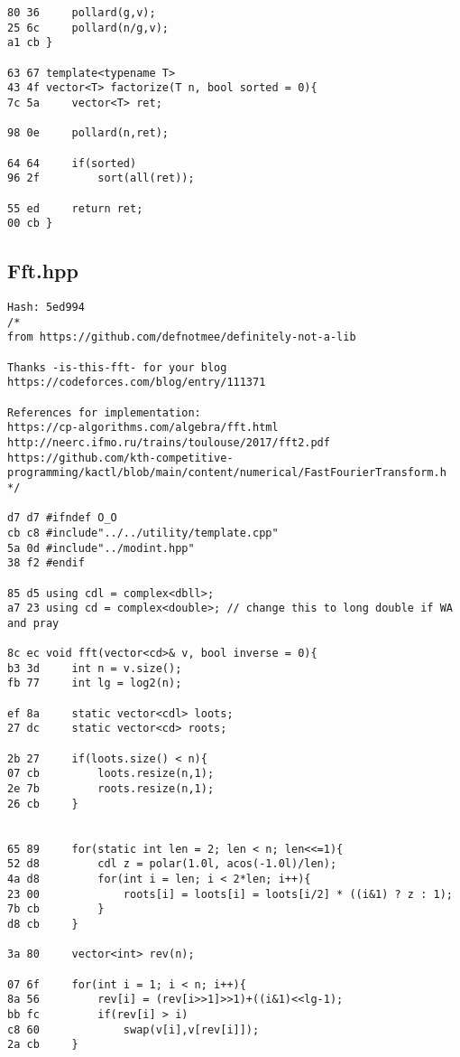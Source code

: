 \documentclass[11pt, a4paper, twoside]{article}
\begin{document}
\begin{lstlisting}
80 36     pollard(g,v);
25 6c     pollard(n/g,v);
a1 cb }

63 67 template<typename T>
43 4f vector<T> factorize(T n, bool sorted = 0){
7c 5a     vector<T> ret;
      
98 0e     pollard(n,ret);
      
64 64     if(sorted)
96 2f         sort(all(ret));
      
55 ed     return ret;
00 cb }
\end{lstlisting}

\subsection{Fft.hpp}
\begin{lstlisting}
Hash: 5ed994
/*
from https://github.com/defnotmee/definitely-not-a-lib

Thanks -is-this-fft- for your blog https://codeforces.com/blog/entry/111371

References for implementation: 
https://cp-algorithms.com/algebra/fft.html
http://neerc.ifmo.ru/trains/toulouse/2017/fft2.pdf
https://github.com/kth-competitive-programming/kactl/blob/main/content/numerical/FastFourierTransform.h
*/

d7 d7 #ifndef O_O
cb c8 #include"../../utility/template.cpp"
5a 0d #include"../modint.hpp"
38 f2 #endif

85 d5 using cdl = complex<dbll>;
a7 23 using cd = complex<double>; // change this to long double if WA and pray

8c ec void fft(vector<cd>& v, bool inverse = 0){
b3 3d     int n = v.size();
fb 77     int lg = log2(n);
      
ef 8a     static vector<cdl> loots;
27 dc     static vector<cd> roots;
      
2b 27     if(loots.size() < n){
07 cb         loots.resize(n,1);
2e 7b         roots.resize(n,1);
26 cb     }
          
      
65 89     for(static int len = 2; len < n; len<<=1){
52 d8         cdl z = polar(1.0l, acos(-1.0l)/len);
4a d8         for(int i = len; i < 2*len; i++){
23 00             roots[i] = loots[i] = loots[i/2] * ((i&1) ? z : 1);
7b cb         }
d8 cb     }
      
3a 80     vector<int> rev(n);
      
07 6f     for(int i = 1; i < n; i++){
8a 56         rev[i] = (rev[i>>1]>>1)+((i&1)<<lg-1);
bb fc         if(rev[i] > i)
c8 60             swap(v[i],v[rev[i]]);
2a cb     }
          

\end{lstlisting}
\end{document}
